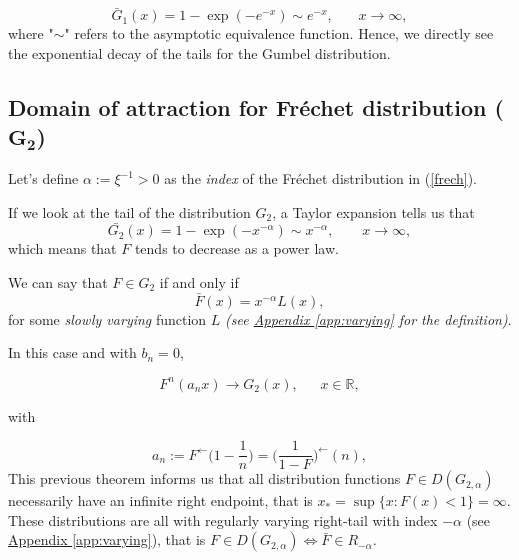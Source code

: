 \begin{equation*}
\bar{G}_1(x)=1-\exp(-e^{-x})\sim e^{-x}, \ \ \ \ \ \ \ \ x\to\infty,
\end{equation*}
where "$\sim$" refers to the asymptotic equivalence function. Hence, we directly see the exponential decay of the tails for the Gumbel distribution.

\subsection*{Domain of attraction for Fréchet distribution ($\mathbf{G_{2}}$)}

Let's define $\alpha:=\xi^{-1}>0$ as the \emph{index} of the Fréchet distribution in (\ref{frech}).

\begin{definition}
If we look at the tail of the distribution $G_2$, a Taylor expansion tells us that
\begin{equation}\label{eq:powerlaw}
\bar{G_2}(x)=1-\exp (-x^{-\alpha})\sim x^{-\alpha}, \qquad x\to\infty, 
\end{equation}
which means that $F$ tends to decrease as a power law. 
\end{definition}


\begin{theorem}
We can say that $F \in G_{2}$ if and only if 
\begin{equation}
\bar{F}(x)=x^{-\alpha} L(x),
\end{equation}
for some \emph{slowly varying} function $L$ \emph{(see \hyperref[app:varying]{Appendix \ref{app:varying}} for the definition)}. 
\end{theorem}

In this case and with $b_n=0$,

\begin{equation*}
F^n(a_nx)\to G_2(x), \ \ \ \ \ \ \  x\in\mathbb{R},
\end{equation*}

with

\begin{equation*}
a_n:=F^{\leftarrow}\Big(1-\frac{1}{n}\Big)=\Big(\frac{1}{1-F}\Big)^{\leftarrow}(n),
\end{equation*}
This previous theorem informs us that all distribution functions $F\in D(G_{2,\alpha})$ necessarily have an infinite right endpoint, that is $x_*=\sup\{x:F(x)<1\}=\infty$. These distributions are all with regularly varying right-tail with index $-\alpha$ (see \hyperref[app:varying]{Appendix \ref{app:varying}}), that is $F\in D(G_{2,\alpha})\Longleftrightarrow \bar{F}\in R_{-\alpha}$.



